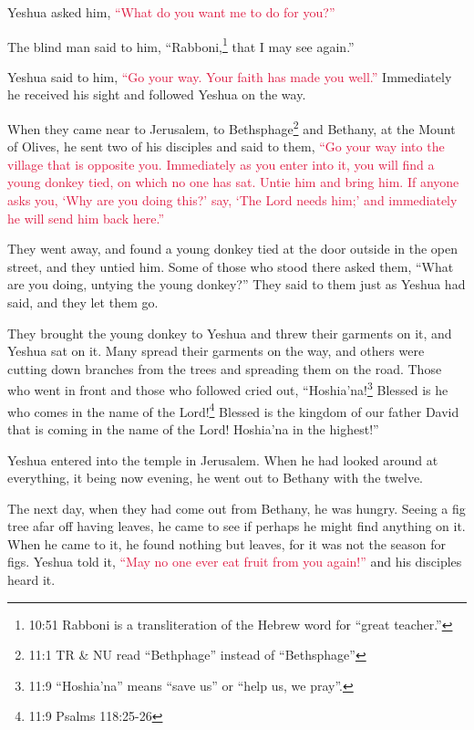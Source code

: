 \myverse{}Yeshua asked him,
\textcolor{crimson}{“What do you want me to do for you?”}

The blind man said to him, “Rabboni,\footnote{10:51 Rabboni is a transliteration of the Hebrew word for “great teacher.”} that I may see
again.”

\myverse{}Yeshua said to him,
\textcolor{crimson}{“Go your way. Your faith has made you well.”
} Immediately he received his sight and followed Yeshua on the way.


\mychapter{} \myverse*{}When they came near to Jerusalem, to Bethsphage\footnote{11:1 TR \& NU read “Bethphage” instead of “Bethsphage”} and Bethany, at the Mount of Olives,
he sent two of his disciples
\myverse{}and said to them,
\textcolor{crimson}{“Go your way into the village that is opposite you. Immediately as you enter into it, you will find
	a young donkey tied, on which no one has sat. Untie him and bring him.
}
\myverse{}\textcolor{crimson}{If anyone asks you, ‘Why are you doing this?’ say, ‘The Lord needs him;’
	and immediately he will send him back here.”}

\myverse{}They went away, and found a young donkey tied at the door outside
in the open street, and they untied him.
\myverse{}Some of those who stood there asked them, “What are you doing, untying the
young donkey?”
\myverse{}They said to them just as Yeshua had said, and they let them go.

\myverse{}They brought the young donkey to Yeshua and threw their garments
on it, and Yeshua sat on it.
\myverse{}Many spread their garments on the way, and others were cutting down branches
from the trees and spreading them on the road.
\myverse{}Those who went in front and those who followed cried out, “Hoshia'na!\footnote{11:9 “Hoshia'na” means “save us” or “help us, we pray”.} Blessed is he who comes in the name
of the Lord!\footnote{11:9 Psalms 118:25-26}
\myverse{}Blessed is the kingdom of our father David that is coming in the name of
the Lord! Hoshia'na in the highest!”

\myverse{}Yeshua entered into the temple in Jerusalem. When he had looked
around at everything, it being now evening, he went out to Bethany with the twelve.

\myverse{}The next day, when they had come out from Bethany, he was hungry.
\myverse{}Seeing a fig tree afar off having leaves, he came to see if perhaps he might
find anything on it. When he came to it, he found nothing but leaves, for it was not the season for figs.
\myverse{}Yeshua told it,
\textcolor{crimson}{“May no one ever eat fruit from you again!”
} and his disciples heard it.

